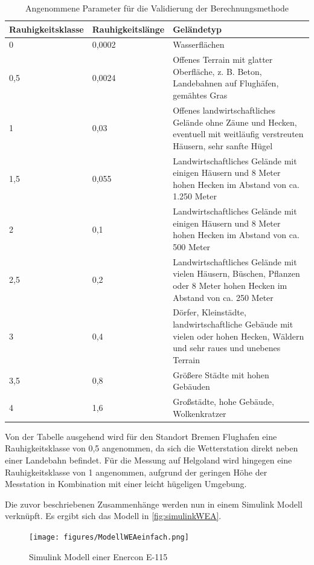 \begin{table} [H]
	\begin{tabular}[htpb]{p{4cm}|p{3cm}|p{7cm}}
		\textbf{Rauhigkeitsklasse} & \textbf{Rauhigkeitslänge} & \textbf{Geländetyp} \\
		\hline
		0 & 0,0002 & Wasserflächen \\
		\hline
		0,5 & 0,0024 & Offenes Terrain mit glatter Oberfläche, z. B. Beton, Landebahnen auf Flughäfen, gemähtes Gras \\
		\hline
		1 & 0,03 & Offenes landwirtschaftliches Gelände ohne Zäune und Hecken, eventuell mit weitläufig verstreuten Häusern, sehr sanfte Hügel \\
		\hline
		1,5 & 0,055 & Landwirtschaftliches Gelände mit einigen Häusern und 8 Meter hohen Hecken im Abstand von ca. 1.250 Meter \\
		\hline
		2 & 0,1 & Landwirtschaftliches Gelände mit einigen Häusern und 8 Meter hohen Hecken im Abstand von ca. 500 Meter \\
		\hline
		2,5 & 0,2 & Landwirtschaftliches Gelände mit vielen Häusern, Büschen, Pflanzen oder 8 Meter hohen Hecken im Abstand von ca. 250 Meter \\
		\hline
		3 & 0,4 & Dörfer, Kleinstädte, landwirtschaftliche Gebäude mit vielen oder hohen Hecken, Wäldern und sehr raues und unebenes Terrain \\
		\hline
		3,5 & 0,8 & Größere Städte mit hohen Gebäuden \\
		\hline
		4 & 1,6 & Großstädte, hohe Gebäude, Wolkenkratzer \\
	\end{tabular}
\centering
\caption{Angenommene Parameter für die Validierung der Berechnungsmethode \cite{Rauigkeit}}
\label{tab:Rauigkeit}
\end{table}

Von der Tabelle ausgehend wird für den Standort Bremen Flughafen eine Rauhigkeitsklasse von 0,5 angenommen, da sich die Wetterstation direkt neben einer Landebahn befindet. Für die Messung auf Helgoland wird hingegen eine Rauhigkeitsklasse von 1 angenommen, aufgrund der geringen Höhe der Messtation in Kombination mit einer leicht hügeligen Umgebung.

Die zuvor beschriebenen Zusammenhänge werden nun in einem Simulink Modell verknüpft. Es ergibt sich das Modell in \autoref{fig:simulinkWEA}.

\begin{figure}[H]
	\centering
	\texttt{[image: figures/ModellWEAeinfach.png]}
	\caption{Simulink Modell einer Enercon E-115}
	\label{fig:simulinkWEA}
\end{figure}


